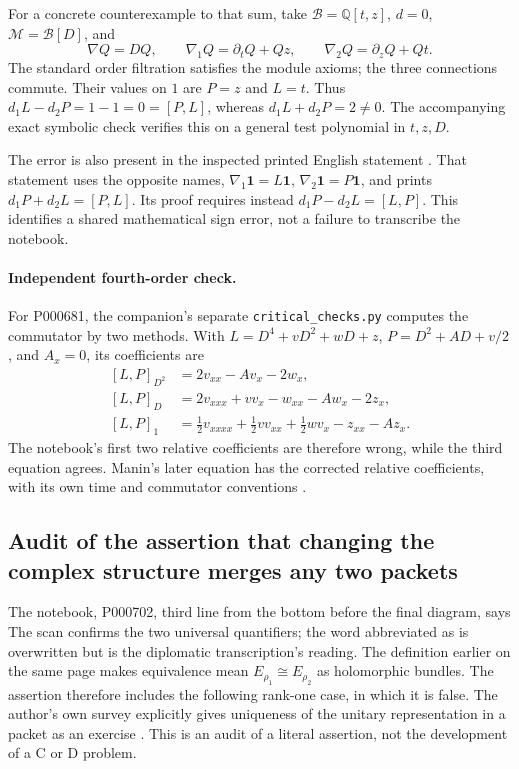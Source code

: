 For a concrete counterexample to that sum, take
\(\mathcal B=\mathbb Q[t,z]\), \(d=0\),
\(\mathcal M=\mathcal B[D]\), and
\[
 \nabla Q=DQ,\qquad
 \nabla_1Q=\partial_tQ+Qz,\qquad
 \nabla_2Q=\partial_zQ+Qt.
\]
The standard order filtration satisfies the module axioms; the three
connections commute. Their values on \(1\) are \(P=z\) and \(L=t\).
Thus \(d_1L-d_2P=1-1=0=[P,L]\), whereas
\(d_1L+d_2P=2\ne0\). The accompanying exact symbolic check verifies this
on a general test polynomial in \(t,z,D\).

The error is also present in the inspected printed English statement
\citep[Chapter~III, Theorem~2.6, p.~83]{manin1978algebraic}.
That statement uses the opposite names,
\(\nabla_1\mathbf1=L\mathbf1\), \(\nabla_2\mathbf1=P\mathbf1\),
and prints \(d_1P+d_2L=[P,L]\). Its proof requires instead
\(d_1P-d_2L=[L,P]\). This identifies a shared mathematical sign error,
not a failure to transcribe the notebook.

\paragraph{Independent fourth-order check.}\oursComputed{}
For P000681, the companion's separate \texttt{critical\_checks.py} computes
the commutator by two methods. With \(L=D^4+vD^2+wD+z\),
\(P=D^2+AD+v/2\), and \(A_x=0\), its coefficients are
\[
\begin{aligned}
[L,P]_{D^2}&=2v_{xx}-Av_x-2w_x,\\
[L,P]_{D}&=2v_{xxx}+vv_x-w_{xx}-Aw_x-2z_x,\\
[L,P]_{1}&=\tfrac12v_{xxxx}+\tfrac12vv_{xx}+\tfrac12wv_x-z_{xx}-Az_x.
\end{aligned}
\]
The notebook's first two relative coefficients are therefore wrong, while
the third equation agrees. Manin's later equation has the corrected relative
coefficients, with its own time and commutator conventions
\citep[Chapter~III, \S6.3, equation~(17), p.~96]{manin1978algebraic}.


\subsection{Audit of the assertion that changing the complex structure merges any two packets}

The notebook, P000702, third line from the bottom before the final diagram, says
The scan confirms the two universal quantifiers; the word abbreviated as
 is overwritten but is the diplomatic transcription's reading.
The definition earlier on the same page makes equivalence mean
\(E_{\rho_1}\cong E_{\rho_2}\) as holomorphic bundles.  The assertion therefore
includes the following rank-one case, in which it is false.  The author's own
survey explicitly gives uniqueness of the unitary representation in a packet
as an exercise \citep[Ch.~II, \S2, Exercise~10, p.~204]{tyurin1978periods}.
This is an audit
of a literal assertion, not the development of a C or D problem.


